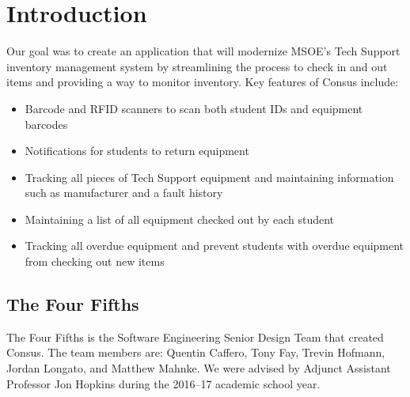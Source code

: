 \section{Introduction}
\label{sec:introduction}

Our goal was to create an application that will modernize MSOE's Tech Support inventory management system by streamlining the process to check in and out items and providing a way to monitor inventory.
Key features of Consus include:
\begin{itemize}
  \item Barcode and RFID scanners to scan both student IDs and equipment barcodes
  \item Notifications for students to return equipment
  \item Tracking all pieces of Tech Support equipment and maintaining information such as manufacturer and a fault history
  \item Maintaining a list of all equipment checked out by each student
  \item Tracking all overdue equipment and prevent students with overdue equipment from checking out new items
\end{itemize}

\subsection{The Four Fifths}

The Four Fifths is the Software Engineering Senior Design Team that created Consus.
The team members are: Quentin Caffero, Tony Fay, Trevin Hofmann, Jordan Longato, and Matthew Mahnke.
We were advised by Adjunct Assistant Professor Jon Hopkins during the 2016--17 academic school year.
